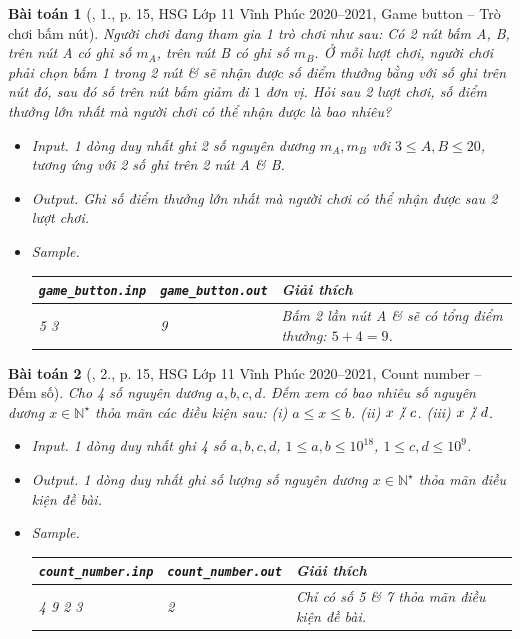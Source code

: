 \documentclass{article}
\newtheorem{baitoan}{Bài toán}
\DeclareRobustCommand{\divby}{%
	\mathrel{\vbox{\baselineskip.65ex\lineskiplimit0pt\hbox{.}\hbox{.}\hbox{.}}}%
}
\begin{document}
\begin{baitoan}[\cite{Trung_HSG_THPT_Tin}, 1., p. 15, HSG Lớp 11 Vĩnh Phúc 2020--2021, Game button -- Trò chơi bấm nút]
	Người chơi đang tham gia 1 trò chơi như sau: Có 2 nút bấm A, B, trên nút A có ghi số $m_A$, trên nút B có ghi số $m_B$. Ở mỗi lượt chơi, người chơi phải chọn bấm 1 trong 2 nút \& sẽ nhận được số điểm thưởng bằng với số ghi trên nút đó, sau đó số trên nút bấm giảm đi $1$ đơn vị. Hỏi sau 2 lượt chơi, số điểm thưởng lớn nhất mà người chơi có thể nhận được là bao nhiêu?
	\begin{itemize}
		\item {\sf Input.} 1 dòng duy nhất ghi 2 số nguyên dương $m_A,m_B$ với $3\le A,B\le20$, tương ứng với 2 số ghi trên 2 nút A \& B.
		\item {\sf Output.} Ghi số điểm thưởng lớn nhất mà người chơi có thể nhận được sau 2 lượt chơi.
		\item {\sf Sample.}
		\begin{table}[H]
			\centering
			\begin{tabular}{|l|l|l|}
				\hline
				\verb|game_button.inp| & \verb|game_button.out| & Giải thích\\
				\hline
				5 3 & 9 & Bấm 2 lần nút A \& sẽ có tổng điểm thưởng: $5 + 4 = 9$. \\
				\hline
			\end{tabular}
		\end{table}
	\end{itemize}
\end{baitoan}

\begin{baitoan}[\cite{Trung_HSG_THPT_Tin}, 2., p. 15, HSG Lớp 11 Vĩnh Phúc 2020--2021, Count number -- Đếm số]
	Cho 4 số nguyên dương $a,b,c,d$. Đếm xem có bao nhiêu số nguyên dương $x\in\mathbb{N}^\star$ thỏa mãn các điều kiện sau: (i) $a\le x\le b$. (ii) $x\not{\divby}\ c$. (iii) $x\not{\divby}\ d$.
	\begin{itemize}
		\item {\sf Input.} 1 dòng duy nhất ghi 4 số $a,b,c,d$, $1\le a,b\le10^{18}$, $1\le c,d\le10^9$.
		\item {\sf Output.} 1 dòng duy nhất ghi số lượng số nguyên dương $x\in\mathbb{N}^\star$ thỏa mãn điều kiện đề bài.
		\item {\sf Sample.}
		\begin{table}[H]
			\centering
			\begin{tabular}{|l|l|l|}
				\hline
				\verb|count_number.inp| & \verb|count_number.out| & Giải thích \\
				\hline
				4 9 2 3 & 2 & Chỉ có số 5 \& 7 thỏa mãn điều kiện đề bài. \\
				\hline
			\end{tabular}
		\end{table}
	\end{itemize}
\end{baitoan}
\end{document}
